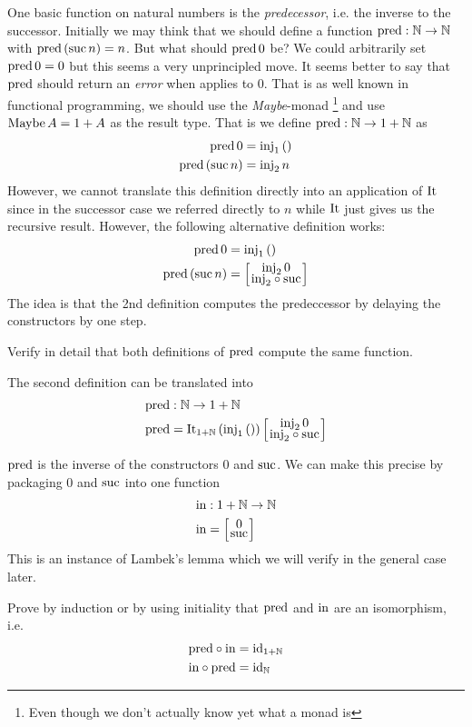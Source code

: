 One basic function on natural numbers is the \emph{predecessor}, i.e. the inverse to the successor. Initially we may think that we should define a function $\mathrm{pred} : \mathbb{N} \to \mathbb{N}$ with $\mathrm{pred}\,(\mathrm{suc}\,n) = n$. But what should $\mathrm{pred}\,0$ be? We could arbitrarily set $\mathrm{pred}\,0 = 0$ but this seems a very unprincipled move. It seems better to say that $\mathrm{pred}$ should return an \emph{error} when applies to $0$. That is as well known in functional programming, we should use the \emph{Maybe}-monad
\footnote{Even though we don't actually know yet what a monad is}
and use $\mathrm{Maybe}\,A = 1 + A$ as the result type. That is we define $\mathrm{pred} : \mathbb{N} \to 1 + \mathbb{N}$ as
\begin{align*}
\mathrm{pred}\,0 & = \mathrm{inj}_1\,() \\
\mathrm{pred}\,(\mathrm{suc}\,n) & = \mathrm{inj}_2\,n
\end{align*}
However, we cannot translate this definition directly into an application of $\mathrm{It}$ since in the successor case we referred directly to $n$ while $\mathrm{It}$ just gives us the recursive result. However, the following alternative definition works:
\begin{align*}
\pred\,0 & = \inj_1\,() \\
\pred\,(\suc\,n) & = \case{\inj_2\,0}{\inj_2 \circ \suc}
\end{align*}
The idea is that the 2nd definition computes the predeccessor by delaying the constructors by one step.
\begin{Exercise}
Verify in detail that both definitions of $\mathrm{pred}$ compute the same function.                     
\end{Exercise}
The second definition can be translated into 
\begin{align*}
& \pred : \Nat \to 1+\Nat \\
& \pred = \It_{1+\Nat}\,(\inj_1\,())\, \case{\inj_2\,0}{\inj_2 \circ \suc}
\end{align*}

$\mathrm{pred}$ is the inverse of the constructors $0$ and $\mathrm{suc}$. We can make this precise by packaging $0$ and $\mathrm{suc}$ into one function 
\begin{align*}
& \inn : 1+\Nat \to \Nat \\
& \inn = \case{0}{\suc} 
\end{align*}
This is an instance of Lambek's lemma which we will verify in the general case later. 
\begin{Exercise}
  Prove by induction or by using initiality that $\mathrm{pred}$ and $\mathrm{in}$ are an isomorphism, i.e.
  \begin{align*}
    \mathrm{pred} \circ \mathrm{in} & = \mathrm{id}_{1+\mathbb{N}} \\
    \mathrm{in} \circ \mathrm{pred} & = \mathrm{id}_{\mathbb{N}}
  \end{align*}
\end{Exercise}

